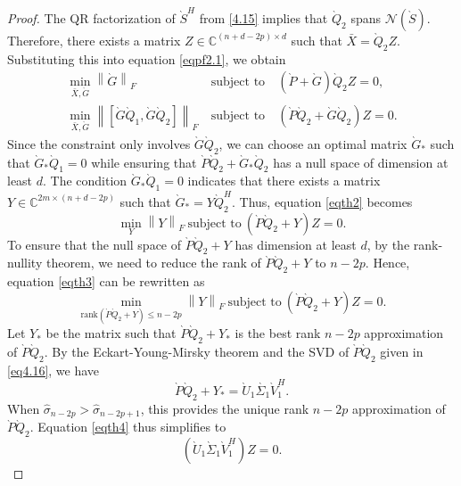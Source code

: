 \documentclass[preprint,11pt,3p]{elsarticle}
\newcommand\norm[1]{\left\lVert#1\right\rVert}
\def \C{{\mathbb C}}
\def \rank{\mathrm{rank}}
\begin{document}
\begin{proof}
	The QR factorization of $\grave{S}^H$ from \eqref{4.15} implies that $\grave{Q}_2$ spans $\mathcal{N}(\grave{S})$. Therefore, there exists a matrix $Z \in \C^{(n+d-2p) \times d}$ such that $\bar{X} = \grave{Q}_2 Z$. Substituting this into equation \eqref{eqpf2.1}, we obtain
	\begin{eqnarray}
		\min_{ \bar{X}, \grave{G}} \norm{\grave{G}}_F ~ &\textrm{subject to}& ~ \left(\grave{P}+\grave{G}\right)\grave{Q}_2Z = 0, \nonumber \\
		\min_{ \bar{X}, \grave{G}} \norm{\left[\grave{G}\grave{Q}_1, \grave{G}\grave{Q}_2\right]}_F ~ &\textrm{subject to}& ~ \left(\grave{P}\grave{Q}_2+\grave{G}\grave{Q}_2\right)Z = 0. \label{eqth2}
	\end{eqnarray}
Since the constraint only involves $\grave{G}\grave{Q}_2$, we can choose an optimal matrix $\grave{G}_{*}$ such that $\grave{G}_{*}\grave{Q}_1 =0$ while ensuring that $\grave{P}\grave{Q}_2 + \grave{G}_{*}\grave{Q}_2$ has a null space of dimension at least $d$. The condition $\grave{G}_{*}\grave{Q}_1=0$ indicates that there exists a matrix $Y \in \mathbb{C}^{2m \times (n+d-2p)}$ such that $\grave{G}_{*} = Y\grave{Q}_{2}^H$. Thus, equation \eqref{eqth2} becomes
	\begin{equation}\label{eqth3}
		\min_{Y}\norm{Y}_F ~ \textrm{subject to} ~ \left(\grave{P}\grave{Q}_2+Y\right)Z=0.
	\end{equation}
To ensure that the null space of $\grave{P}\grave{Q}_2+Y$ has dimension at least $d$, by the rank-nullity theorem, we need to reduce the rank of $\grave{P}\grave{Q}_2+Y$ to $n-2p$. Hence, equation \eqref{eqth3} can be rewritten as
	\begin{equation}\label{eqth4}
		\min_{\rank(\grave{P}\grave{Q}_2 +Y) \leq n-2p}\norm{Y}_F ~ \textrm{subject to} ~ \left(\grave{P}\grave{Q}_2+Y\right)Z=0.
	\end{equation}
Let $Y_{*}$ be the matrix such that $\grave{P}\grave{Q}_2+Y_{*}$ is the best rank $n-2p$ approximation of $\grave{P}\grave{Q}_2$. By the Eckart-Young-Mirsky theorem and the SVD of $\grave{P}\grave{Q}_2$ given in \eqref{eq4.16}, we have
\begin{equation*}
\grave{P}\grave{Q}_2+Y_{*}  = \grave{U}_1 \grave{\Sigma_1}\grave{V}_1^H.
\end{equation*}
When $\hat{\sigma}_{n-2p} > \hat{\sigma}_{n-2p+1}$, this provides the unique rank $n-2p$ approximation of $\grave{P}\grave{Q}_2$. Equation \eqref{eqth4} thus simplifies to
\begin{equation*}
		\left(\grave{U}_1 \grave{\Sigma}_1\grave{V}_1^H\right)Z=0.

\end{equation*}
\end{proof}
\end{document}
